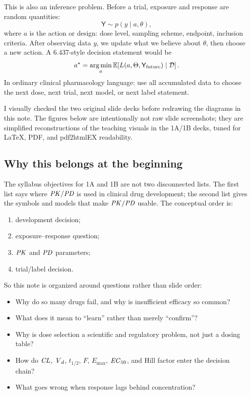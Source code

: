 \documentclass[a4paper]{article}
\renewcommand{\Emax}{\ensuremath{E_{\max}}}
\renewcommand{\ECfifty}{\ensuremath{\pksym{EC}_{50}}}
\DeclareMathOperator*{\argmin}{arg\,min}
\newcommand{\Ex}{\mathbb{E}}
\newcommand{\data}{\mathcal{D}}
\newcommand{\rv}[1]{\mathsf{#1}}
\newcommand{\CL}{\ensuremath{\pksym{CL}}}
\newcommand{\Vd}{\ensuremath{\pksym{V}_d}}
\newcommand{\Fbio}{\ensuremath{F}}
\newcommand{\PK}{\ensuremath{\pksym{PK}}}
\newcommand{\PD}{\ensuremath{\pksym{PD}}}
\newcommand{\PKPD}{\ensuremath{\pksym{PK}/\pksym{PD}}}
\begin{document}
This is also an inference problem. Before a trial, exposure and response are random quantities:
\[
  \rv{Y}\sim p(y\mid a,\theta),
\]
where \(a\) is the action or design: dose level, sampling scheme, endpoint, inclusion criteria. After observing data \(y\), we update what we believe about \(\theta\), then choose a new action. A 6.437-style decision statement would be
\[
  a^\star
  =
  \argmin_a
  \Ex\!\left[L(a,\Theta,\rv{Y}_{\pklab{future}})\mid \data\right].
\]
In ordinary clinical pharmacology language: use all accumulated data to choose the next dose, next trial, next model, or next label statement.

\begin{remark}
  I visually checked the two original slide decks before redrawing the diagrams in this note.  The figures below are intentionally not raw slide screenshots; they are simplified reconstructions of the teaching visuals in the 1A/1B decks, tuned for LaTeX, PDF, and pdf2htmlEX readability.
\end{remark}

\subsection{Why this belongs at the beginning}

The syllabus objectives for 1A and 1B are not two disconnected lists. The first list says where \PKPD{} is used in clinical drug development; the second list gives the symbols and models that make \PKPD{} usable. The conceptual order is:
\begin{enumerate}[label=\arabic*., leftmargin=2.4em]
  \item development decision;
  \item exposure--response question;
  \item \PK{} and \PD{} parameters;
  \item trial/label decision.
\end{enumerate}

So this note is organized around questions rather than slide order:
\begin{itemize}[leftmargin=2em]
  \item Why do so many drugs fail, and why is insufficient efficacy so common?
  \item What does it mean to ``learn'' rather than merely ``confirm''?
  \item Why is dose selection a scientific and regulatory problem, not just a dosing table?
  \item How do \CL, \Vd, \(t_{1/2}\), \Fbio, \Emax, \ECfifty, and Hill factor enter the decision chain?
  \item What goes wrong when response lags behind concentration?
\end{itemize}
\end{document}
